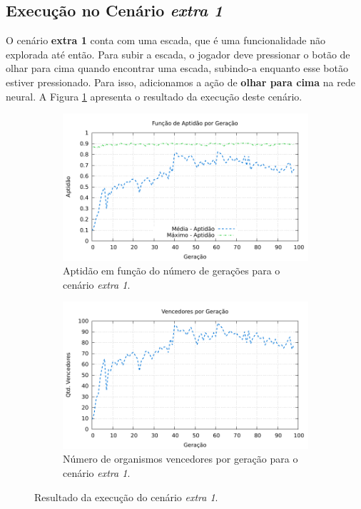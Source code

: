 
\subsection{\label{section:experiment-extra1}Execução no Cenário \textit{extra
1}}

O cenário \textbf{extra 1} conta com uma escada, que é uma funcionalidade não
explorada até então. Para subir a escada, o jogador deve pressionar o botão de
olhar para cima quando encontrar uma escada, subindo-a enquanto esse botão
estiver pressionado. Para isso, adicionamos a ação de \textbf{olhar para cima}
na rede neural. A Figura \ref{fig:extra1-results} apresenta o resultado da
execução deste cenário.

\begin{figure}[H]
\centering
	\begin{subfigure}[b]{0.4\textwidth}
        \includegraphics[width=\textwidth]{fig/extra1-fitness.pdf}
        \caption{Aptidão em função do número de gerações para o cenário
        \textit{extra 1}.}
	\end{subfigure}
	\begin{subfigure}[b]{0.4\textwidth}
        \includegraphics[width=\textwidth]{fig/extra1-winners.pdf}
        \caption{Número de organismos vencedores por geração para o cenário
        \textit{extra 1}.}
	\end{subfigure}

    \caption{Resultado da execução do cenário \textit{extra 1}.}
	\label{fig:extra1-results}
\end{figure}

